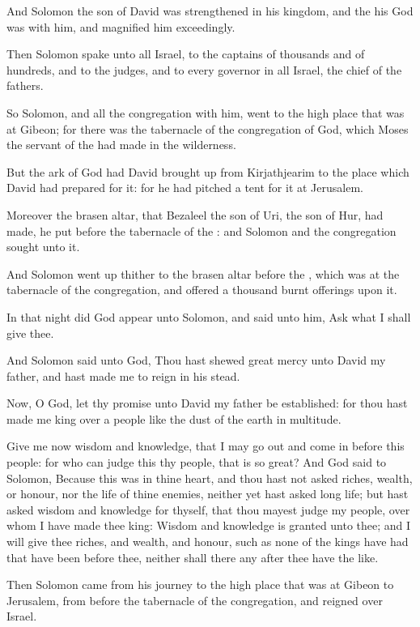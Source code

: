 \Chapter
\Verse And Solomon the son of David was strengthened in his kingdom, and the \LORD his God was with him, and magnified him exceedingly.

\Verse Then Solomon spake unto all Israel, to the captains of thousands and of hundreds, and to the judges, and to every governor in all Israel, the chief of the fathers.

\Verse So Solomon, and all the congregation with him, went to the high place that was at Gibeon; for there was the tabernacle of the congregation of God, which Moses the servant of the \LORD had made in the wilderness.

\Verse But the ark of God had David brought up from Kirjathjearim to the place which David had prepared for it: for he had pitched a tent for it at Jerusalem.

\Verse Moreover the brasen altar, that Bezaleel the son of Uri, the son of Hur, had made, he put before the tabernacle of the \LORD: and Solomon and the congregation sought unto it.

\Verse And Solomon went up thither to the brasen altar before the \LORD, which was at the tabernacle of the congregation, and offered a thousand burnt offerings upon it.

\Verse In that night did God appear unto Solomon, and said unto him, Ask what I shall give thee.

\Verse And Solomon said unto God, Thou hast shewed great mercy unto David my father, and hast made me to reign in his stead.

\Verse Now, O \LORD God, let thy promise unto David my father be established: for thou hast made me king over a people like the dust of the earth in multitude.

\Verse Give me now wisdom and knowledge, that I may go out and come in before this people: for who can judge this thy people, that is so great?  \Verse And God said to Solomon, Because this was in thine heart, and thou hast not asked riches, wealth, or honour, nor the life of thine enemies, neither yet hast asked long life; but hast asked wisdom and knowledge for thyself, that thou mayest judge my people, over whom I have made thee king: \Verse Wisdom and knowledge is granted unto thee; and I will give thee riches, and wealth, and honour, such as none of the kings have had that have been before thee, neither shall there any after thee have the like.

\Verse Then Solomon came from his journey to the high place that was at Gibeon to Jerusalem, from before the tabernacle of the congregation, and reigned over Israel.

